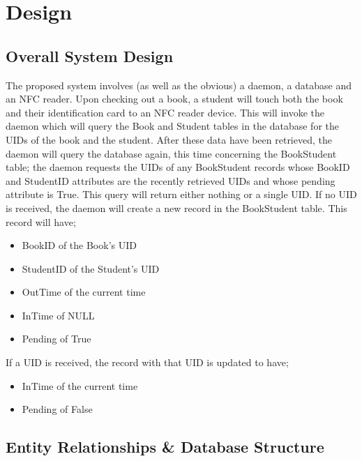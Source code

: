 \documentclass[draft]{book}
\begin{document}

\chapter{Design}

\section{Overall System Design}

The proposed system involves (as well as the obvious) a daemon, a database and
an NFC reader. Upon checking out a book, a student will touch both the book and
their identification card to an NFC reader device. This will invoke the daemon
which will query the Book and Student tables in the database for the UIDs of the
book and the student. After these data have been retrieved, the daemon will
query the database again, this time concerning the BookStudent table; the daemon
requests the UIDs of any BookStudent records whose BookID and StudentID
attributes are the recently retrieved UIDs and whose pending attribute is True.
This query will return either nothing or a single UID. If no UID is received,
the daemon will create a new record in the BookStudent table. This record will
have;\begin{itemize}

    \item BookID of the Book's UID

    \item StudentID of the Student's UID

    \item OutTime of the current time

    \item InTime of NULL

    \item Pending of True

\end{itemize} If a UID is received, the record with that UID is updated to
have;\begin{itemize}

    \item InTime of the current time

    \item Pending of False

\end{itemize}

\section{Entity Relationships \& Database Structure}
\end{document}
